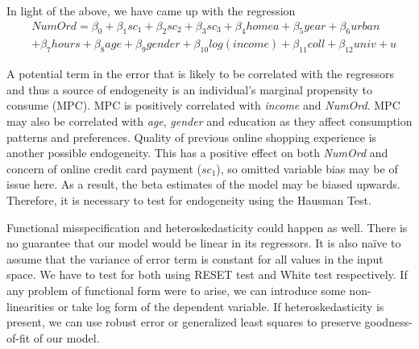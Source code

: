 \documentclass[11pt,twoside]{article}
\begin{document}
In light of the above, we have came up with the regression
\begin{equation}
\begin{split}
    & NumOrd = \beta_0 + \beta_1sc_1 + \beta_2sc_2 + \beta_3sc_3 + \beta_4homea + \beta_5year + \beta_6urban \\
    & + \beta_7hours + \beta_8age + \beta_9gender + \beta_{10}log(income) + \beta_{11}coll + \beta_{12}univ + u
\end{split}
\end{equation}

A potential term in the error that is likely to be correlated with the regressors and thus a source of endogeneity is an individual’s marginal propensity to consume (MPC). MPC is positively correlated with \textit{income} and \textit{NumOrd}. MPC may also be correlated with \textit{age}, \textit{gender} and education as they affect consumption patterns and preferences. Quality of previous online shopping experience is another possible endogeneity. This has a positive effect on both \textit{NumOrd} and concern of online credit card payment (\textit{$sc_1$}), so omitted variable bias may be of issue here. As a result, the beta estimates of the model may be biased upwards. Therefore, it is necessary to test for endogeneity using the Hausman Test.

Functional misspecification and heteroskedasticity could happen as well. There is no guarantee that our model would be linear in its regressors. It is also naïve to assume that the variance of error term is constant for all values in the input space. We have to test for both using RESET test and White test respectively. If any problem of functional form were to arise, we can introduce some non-linearities or take log form of the dependent variable. If heteroskedasticity is present, we can use robust error or generalized least squares to preserve goodness-of-fit of our model.
\end{document}
